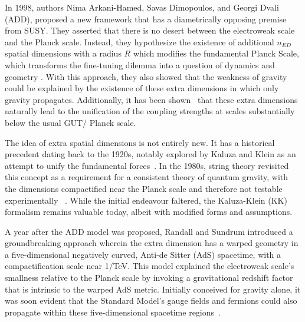 In 1998, authors Nima Arkani-Hamed, Savas Dimopoulos, and Georgi Dvali (ADD), proposed a new framework\cite{Arkani-Hamed:1998jmv, Arkani-Hamed:1998sfv} that has a diametrically opposing premise from SUSY. They asserted that there is no desert between the electroweak scale and the Planck scale. Instead, they hypothesize the existence of additional $n_{ED}$ spatial dimensions with a radius $R$ which modifies the fundamental Planck Scale, which transforms the fine-tuning dilemma into a question of dynamics and geometry \cite{5LittleStringTheoryAtATeV}. With this approach, they also showed that the weakness of gravity could be explained by the existence of these extra dimensions in which only gravity propagates. Additionally, it has been shown~\cite{Dienes:1998vg, Dienes:1998vh} that these extra dimensions naturally lead to the unification of the coupling strengths at scales substantially below the usual GUT/ Planck scale. 

The idea of extra spatial dimensions is not entirely new. It has a historical precedent dating back to the 1920s, notably explored by Kaluza and Klein as an attempt to unify the fundamental forces~\cite{Kaluza:1921tu, Klein:1926fj, Klein:1926tv}. In the 1980s, string theory revisited this concept as a requirement for a consistent theory of quantum gravity, with the dimensions compactified near the Planck scale and therefore not testable experimentally ~\cite{ParticleDataGroup:2020ssz}. While the initial endeavour faltered, the Kaluza-Klein (KK) formalism remains valuable today, albeit with modified forms and assumptions. 

A year after the ADD model was proposed, Randall and Sundrum introduced a groundbreaking approach wherein the extra dimension has a warped geometry in a five-dimensional negatively curved, Anti-de Sitter (AdS) spacetime, with a compactification scale near 1/TeV. This model explained the electroweak scale's smallness relative to the Planck scale by invoking a gravitational redshift factor that is intrinsic to the warped AdS metric. Initially conceived for gravity alone, it was soon evident that the Standard Model's gauge fields and fermions could also propagate within these five-dimensional spacetime regions~\cite{Randall:1999ee, Randall:1999vf, ParticleDataGroup:2020ssz}. 

